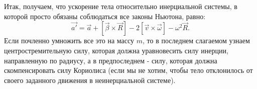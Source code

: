Итак, получаем, что ускорение тела относительно инерциальной системы, в которой просто обязаны соблюдаться все законы Ньютона, равно:
   \begin{displaymath}
   \vec{a\prime}=
   \vec{a}+
   \left[\vec{\beta}\times\vec{R}\right]-
   2\left[\vec{v}\times\vec{\omega}\right]-
   \omega^2\vec{R}.
   \end{displaymath}
 Если почленно умножить все это на массу $m$, то в последнем слагаемом узнаем центростремительную силу, которая должна уравновесить силу инерции, направленную по радиусу, а в предпоследнем - силу, которая должна скомпенсировать силу Кориолиса (если мы не хотим, чтобы тело отклонилось от своего заданного движения в неинерциальной системе).

